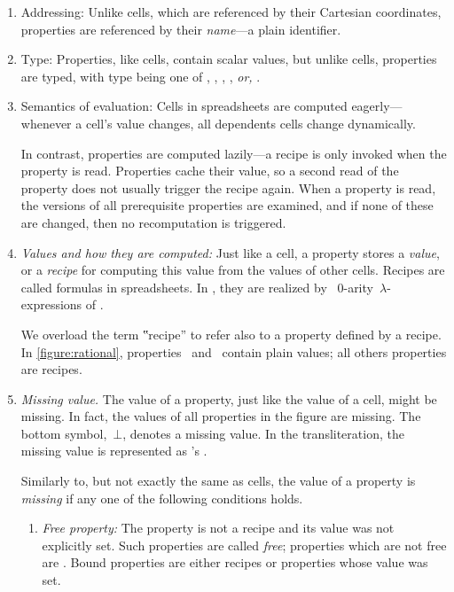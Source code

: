 \begin{enumerate}
  \item{Addressing:} Unlike cells, which are referenced by their Cartesian coordinates,
  properties are referenced by their \emph{name}---a plain identifier.

  \item{Type:} Properties, like cells, contain scalar values, but unlike cells,
  properties are typed, with type being one of , ,
  , , \emph{or,} .

  \item{Semantics of evaluation:} Cells in spreadsheets are computed
  eagerly---whenever a cell's value changes, all dependents cells change
  dynamically.

  In contrast, properties are computed lazily---a recipe is only invoked
  when the property is read. Properties cache their value, so a second read
  of the property does not usually trigger the recipe again. 
  When a property is read, the versions of all prerequisite
  properties are examined, and if none of these are changed, then no
  recomputation is triggered.

  \item\emph{Values and how they are computed:} Just like a cell, a property
  stores a \emph{value}, or a \emph{recipe} for computing this value from the
  values of other cells.
  Recipes are called formulas in spreadsheets. In \Reap, they are realized
  by \Java~$0$-arity~$λ$-expressions of \Java.

  We overload the term ‟recipe” to refer also to a property defined by a recipe.
  In \cref{figure:rational}, properties~ and~ contain plain values; all others properties
  are recipes.

  \item\emph{Missing value.} The value of a property, just like the value
  of a cell, might be missing. In fact, the values of all properties in
  the figure are missing. The bottom symbol,~$⊥$, denotes a missing value.
  In the transliteration, the missing value is represented as \Java's
  .

  Similarly to, but not exactly the same as cells, the value of a property
  is \emph{missing} if any one of the following conditions holds.

  \begin{enumerate}
    \item \emph{Free property:} The property is not a recipe and its
          value was not explicitly set. Such properties are called \emph{free};
          properties which are not free are .
          Bound properties are either recipes or properties whose value was
          set.


\end{enumerate}
\end{enumerate}
